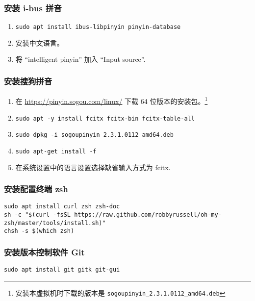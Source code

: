 \documentclass[
    11pt,
    cite=authoryear,
    device=phone,
    lang=cn,
    mode=simple,
    result=answer,
    toc=onecol,
]{elegantbook_sierxue}
\begin{document}

\subsubsection{安装 i-bus 拼音}%
\label{ssub:pinyin-i-bus}
\begin{enumerate}
    \item \lstinline{sudo apt install ibus-libpinyin pinyin-database}
    \item 安装中文语言。
    \item 将 ``intelligent pinyin'' 加入 ``Input source''.
\end{enumerate}

\subsubsection{安装搜狗拼音}%
\label{ssub:pinyin-sogou}
\begin{enumerate}
    \item 在 \href{https://pinyin.sogou.com/linux/}
        {https://pinyin.sogou.com/linux/} 下载 64 位版本的安装包。\footnote{
            安装本虚拟机时下载的版本是
            \lstinline{sogoupinyin_2.3.1.0112_amd64.deb}
        }
    \item \lstinline{sudo apt -y install fcitx fcitx-bin fcitx-table-all}
    \item \lstinline{sudo dpkg -i sogoupinyin_2.3.1.0112_amd64.deb}
    \item \lstinline{sudo apt-get install -f}
    \item 在系统设置中的语言设置选择缺省输入方式为 fcitx.
\end{enumerate}

\subsubsection{安装配置终端 zsh}%
\label{ssub:vm-zsh}

\begin{lstlisting}[escapeinside=``]
sudo apt install curl zsh zsh-doc
sh -c "$(curl -fsSL https://raw.github.com/robbyrussell/oh-my-zsh/master/tools/install.sh)"
chsh -s $(which zsh)
\end{lstlisting}

\subsubsection{安装版本控制软件 Git}%
\label{ssub:vm-git}

\begin{lstlisting}[escapeinside=``]
sudo apt install git gitk git-gui
\end{lstlisting}
\end{document}
